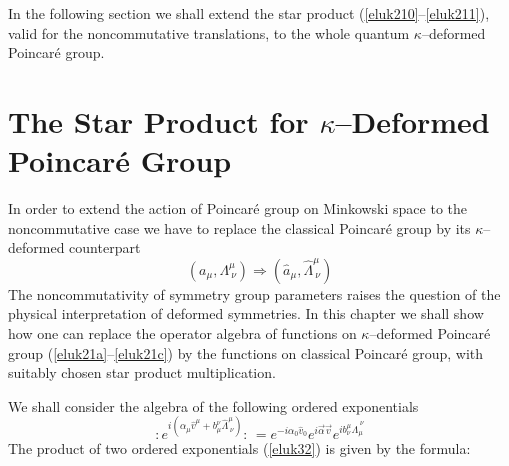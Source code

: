 \documentclass[a4paper,12pt]{article}
\begin{document}
In the following section we shall extend the star product
(\ref{eluk210}--\ref{eluk211}), valid for the noncommutative
translations, to the whole quantum $\kappa$--deformed Poincar\'{e}
group.

\section{The Star Product for $\kappa$--Deformed Poincar\'{e}
Group}


In order to extend the action of Poincar\'{e}  group on Minkowski 
space
 to the noncommutative case we 
have to replace the classical Poincar\'{e} group
 by its $\kappa$--deformed counterpart
\begin{equation}\label{eluk31}
  \left(a_{\mu}, \Lambda^{\mu}_{\ \nu} \right) \Longrightarrow
  \left(\widehat{a}_{\mu}, \widehat{\Lambda}^{\mu}_{\ \nu} \right)
\end{equation}
The noncommutativity of symmetry group parameters raises the
question of the physical interpretation of deformed symmetries. In
this chapter we shall show how one can replace  the operator
algebra of functions on $\kappa$--deformed Poincar\'{e} group
 (\ref{eluk21a}--\ref{eluk21c}) by the functions on classical
  Poincar\'{e} group, with suitably chosen star product
  multiplication.

  We shall    consider the algebra of  the
  following ordered exponentials
\begin{equation}\label{eluk32}
: e^{i(\alpha_{\mu} \widehat{v}^{\mu}
 + b^{\nu}_{\mu}
  \widehat{\Lambda}^{\mu}_{\ \nu} )}: \, =
 e^{-i \alpha_{0}\widehat{v}_{0}}
 e^{i \vec{\alpha}\vec{v} }
 e^{i b_{\nu}^{\mu} \widehat{\Lambda}_{\mu}^{\ \nu}}
 \end{equation}
 The    product of two ordered exponentials (\ref{eluk32}) is
 given by the formula:
\end{document}

